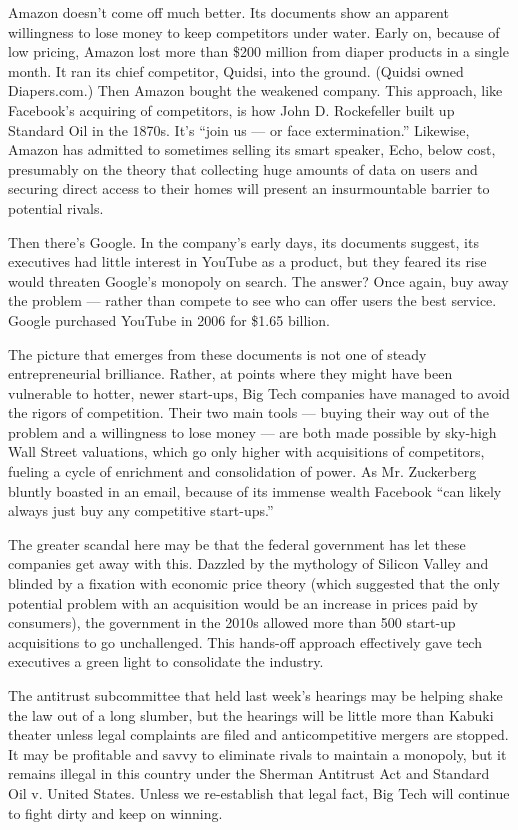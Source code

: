 Amazon doesn't come off much better. Its documents show an apparent
willingness to lose money to keep competitors under water. Early on,
because of low pricing, Amazon lost more than \$200 million from diaper
products in a single month. It ran its chief competitor, Quidsi, into
the ground. (Quidsi owned Diapers.com.) Then Amazon bought the weakened
company. This approach, like Facebook's acquiring of competitors, is how
John D. Rockefeller built up Standard Oil in the 1870s. It's ``join us
--- or face extermination.'' Likewise, Amazon has admitted to sometimes
selling its smart speaker, Echo, below cost, presumably on the theory
that collecting huge amounts of data on users and securing direct access
to their homes will present an insurmountable barrier to potential
rivals.

Then there's Google. In the company's early days, its documents suggest,
its executives had little interest in YouTube as a product, but they
feared its rise would threaten Google's monopoly on search. The answer?
Once again, buy away the problem --- rather than compete to see who can
offer users the best service. Google purchased YouTube in 2006 for
\$1.65 billion.

The picture that emerges from these documents is not one of steady
entrepreneurial brilliance. Rather, at points where they might have been
vulnerable to hotter, newer start-ups, Big Tech companies have managed
to avoid the rigors of competition. Their two main tools --- buying
their way out of the problem and a willingness to lose money --- are
both made possible by sky-high Wall Street valuations, which go only
higher with acquisitions of competitors, fueling a cycle of enrichment
and consolidation of power. As Mr. Zuckerberg bluntly boasted in an
email, because of its immense wealth Facebook ``can likely always just
buy any competitive start-ups.''

The greater scandal here may be that the federal government has let
these companies get away with this. Dazzled by the mythology of Silicon
Valley and blinded by a fixation with economic price theory (which
suggested that the only potential problem with an acquisition would be
an increase in prices paid by consumers), the government in the 2010s
allowed more than 500 start-up acquisitions to go unchallenged. This
hands-off approach effectively gave tech executives a green light to
consolidate the industry.

The antitrust subcommittee that held last week's hearings may be helping
shake the law out of a long slumber, but the hearings will be little
more than Kabuki theater unless legal complaints are filed and
anticompetitive mergers are stopped. It may be profitable and savvy to
eliminate rivals to maintain a monopoly, but it remains illegal in this
country under the Sherman Antitrust Act and Standard Oil v. United
States. Unless we re-establish that legal fact, Big Tech will continue
to fight dirty and keep on winning.

